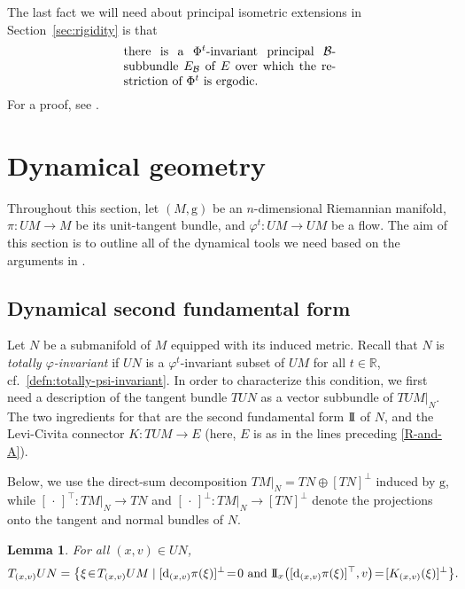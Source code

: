 \documentclass[pdftex]{sigma}
\newcommand{\g}{\mathrm{g}}
\numberwithin{equation}{section}
\newtheorem{Lemma}[Theorem]{Lemma}
\theoremstyle{definition}
\begin{document}
The last fact we will need about principal isometric extensions in Section~\ref{sec:rigidity} is that
\begin{equation}\label{ergodic-component}
 \parbox{.5\textwidth}{there is a $\Phi^t$-invariant principal $\mathcal{B}$-subbundle $E_{\mathcal{B}}$ of $E$ over which the restriction of $\Phi^t$ is ergodic.}
\end{equation}For a proof, see \cite[Proposition 3.2]{cekic2024ergodicity}.

\section{Dynamical geometry} \label{sec:dynamical-geometry}

Throughout this section, let $(M,\g)$ be an $n$-dimensional Riemannian manifold, \mbox{$\pi\colon UM\to M$} be its unit-tangent bundle, and $\varphi^t\colon UM \to UM$ be a flow. The aim of this section is to outline all of the dynamical tools we need based on the arguments in \cite{filip2024finiteness}.

\subsection{Dynamical second fundamental form}
Let $N$ be a submanifold of $M$ equipped with its induced metric. Recall that $N$ is \emph{totally \mbox{$\varphi$-invariant}} if $UN$ is a $\varphi^t$-invariant subset of $UM$ for all $t \in \mathbb{R}$, cf.\ \eqref{defn:totally-psi-invariant}. In order to characterize this condition, we first need a description of the tangent bundle $TUN$ as a vector subbundle of $TUM|_N$. The two ingredients for that are the second fundamental form ${\rm I\!I}$ of $N$, and the Levi-Civita connector $K\colon TUM \to E$ (here, $E$ is as in the lines preceding \eqref{R-and-A}).

Below, we use the direct-sum decomposition $TM|_N = TN\oplus [TN]^\perp$ induced by $\g$, while $[\,\cdot\,]^\top\colon TM|_N\to TN$ and $[\,\cdot\,]^\perp\colon TM|_N \to [TN]^\perp$ denote the projections onto the tangent and normal bundles of $N$.

\begin{Lemma}\label{lem:characterization}
 For all $(x,v) \in UN$,
 \begin{gather} \label{TUN-description} T_{(x,v)}UN
 = \bigl\{ \xi\! \in\! T_{(x,v)}UM \mid [{\rm d}_{(x,v)}\pi(\xi)]^\perp\! =\! 0  \ \text{and} \  {\rm I\!I}_x\bigl([{\rm d}_{(x,v)}\pi(\xi)]^\top, v\bigr)\!=\! [K_{(x,v)}(\xi)]^\perp \bigr\}.\!\!\!
 \end{gather}
\end{Lemma}
\end{document}
